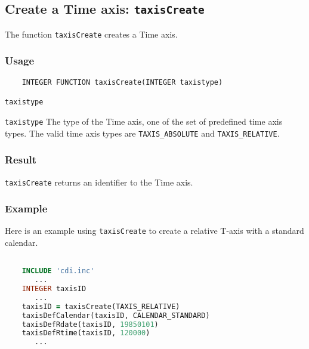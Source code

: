 

\subsection{Create a Time axis: \texttt{taxisCreate}}
\label{taxisCreate}

The function {\texttt{taxisCreate}} creates a Time axis.

\subsubsection*{Usage}

\begin{verbatim}
    INTEGER FUNCTION taxisCreate(INTEGER taxistype)
\end{verbatim}

\hspace*{4mm}\begin{minipage}[]{15cm}
\begin{deflist}{\texttt{taxistype}\ }
\item[\texttt{taxistype}]
The type of the Time axis, one of the set of predefined {\CDI} time axis types.
                      The valid {\CDI} time axis types are {\texttt{TAXIS\_ABSOLUTE}} and {\texttt{TAXIS\_RELATIVE}}.

\end{deflist}
\end{minipage}

\subsubsection*{Result}

{\texttt{taxisCreate}} returns an identifier to the Time axis.


\subsubsection*{Example}

Here is an example using {\texttt{taxisCreate}} to create a relative T-axis with a standard calendar.

\begin{lstlisting}[language=Fortran, backgroundcolor=\color{pyellow}, basicstyle=\small, columns=flexible]

    INCLUDE 'cdi.inc'
       ...
    INTEGER taxisID
       ...
    taxisID = taxisCreate(TAXIS_RELATIVE)
    taxisDefCalendar(taxisID, CALENDAR_STANDARD)
    taxisDefRdate(taxisID, 19850101)
    taxisDefRtime(taxisID, 120000)
       ...
\end{lstlisting}


